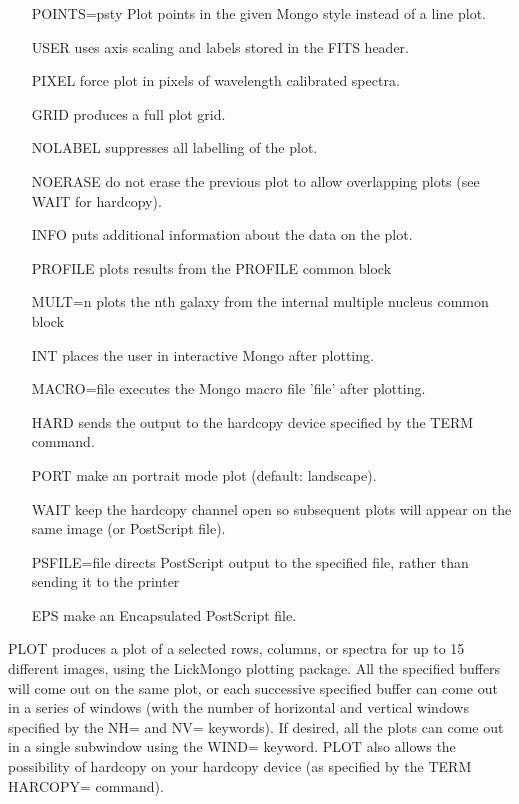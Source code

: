 \begin{itemize}
  \item[POINTS=psty]{Plot points in the given Mongo style instead of a line
                     plot.}
  \item[USER]{uses axis scaling and labels stored in the FITS header.}
  \item[PIXEL]{force plot in pixels of wavelength calibrated spectra.}
  \item[GRID]{produces a full plot grid.}
  \item[NOLABEL]{suppresses all labelling of the plot.}
  \item[NOERASE]{do not erase the previous plot to allow overlapping
       plots (see WAIT for hardcopy).}
  \item[INFO]{puts additional information about the data on the plot.}
  \item[PROFILE ]{plots results from the PROFILE common block}
  \item[MULT=n ]{plots the nth galaxy from the internal multiple
        nucleus common block}
  \item[INT]{places the user in interactive Mongo after plotting.}
  \item[MACRO=file ]{executes the Mongo macro file 'file' after plotting.}
  \item[HARD]{sends the output to the hardcopy device specified by
       the TERM command.}
  \item[PORT]{make an portrait mode plot (default: landscape).}
  \item[WAIT]{keep the hardcopy channel open so subsequent plots will
              appear on the same image (or PostScript file).}
  \item[PSFILE=file]{directs PostScript output to the specified file,
       rather than sending it to the printer}
  \item[EPS]{make an Encapsulated PostScript file.}
\end{itemize}

PLOT produces a plot of a selected rows, columns, or spectra for up to 15
different images, using the LickMongo plotting package. All the specified
buffers will come out on the same plot, or each successive specified buffer
can come out in a series of windows (with the number of horizontal and
vertical windows specified by the NH= and NV= keywords). If desired, all
the plots can come out in a single subwindow using the WIND= keyword.
PLOT also allows the possibility of hardcopy on your hardcopy device
(as specified by the TERM HARCOPY= command).

